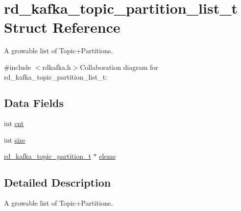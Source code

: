 \hypertarget{structrd__kafka__topic__partition__list__t}{
\section{rd\_\-kafka\_\-topic\_\-partition\_\-list\_\-t Struct Reference}
\label{structrd__kafka__topic__partition__list__t}
}


A growable list of Topic+Partitions.  


{\ttfamily \#include $<$rdkafka.h$>$}Collaboration diagram for rd\_\-kafka\_\-topic\_\-partition\_\-list\_\-t:\subsection*{Data Fields}
\begin{DoxyCompactItemize}
\item 
int \hyperlink{structrd__kafka__topic__partition__list__t_a3b9ea691a2ecea3774a7e994c8c0c805}{cnt}
\item 
int \hyperlink{structrd__kafka__topic__partition__list__t_a476e475526035de7b10cd79991771d57}{size}
\item 
\hyperlink{structrd__kafka__topic__partition__t}{rd\_\-kafka\_\-topic\_\-partition\_\-t} $\ast$ \hyperlink{structrd__kafka__topic__partition__list__t_acf0fc06547578cd074423565440b58da}{elems}
\end{DoxyCompactItemize}


\subsection{Detailed Description}
A growable list of Topic+Partitions. 

